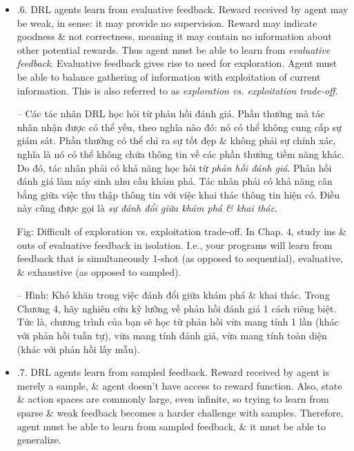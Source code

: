 \documentclass{article}
\begin{document}
\begin{itemize}
\begin{itemize}
\begin{itemize}
            {\bf Difficulty of temporal credit assignment problem.} In Chap. 3, study ins \& outs of sequential feedback in isolation. I.e., your programs learn from simultaneously sequential, supervised (as opposed to evaluative), \& exhaustive (as opposed to sampled) feedback.

            -- {\bf Khó khăn của bài toán gán tín chỉ tạm thời.} Trong Chương 3, hãy nghiên cứu chi tiết \& chi tiết về phản hồi tuần tự 1 cách riêng biệt. Tức là, chương trình của bạn học từ phản hồi tuần tự, có giám sát (khác với phản hồi đánh giá), \& toàn diện (khác với phản hồi lấy mẫu) đồng thời.
            \item {.6. DRL agents learn from evaluative feedback.} Reward received by agent may be weak, in sense: it may provide no supervision. Reward may indicate goodness \& not correctness, meaning it may contain no information about other potential rewards. Thus agent must be able to learn from {\it evaluative feedback}. Evaluative feedback gives rise to need for exploration. Agent must be able to balance gathering of information with exploitation of current information. This is also referred to as {\it exploration vs. exploitation trade-off}.

            -- {\sf Các tác nhân DRL học hỏi từ phản hồi đánh giá.} Phần thưởng mà tác nhân nhận được có thể yếu, theo nghĩa nào đó: nó có thể không cung cấp sự giám sát. Phần thưởng có thể chỉ ra sự tốt đẹp \& không phải sự chính xác, nghĩa là nó có thể không chứa thông tin về các phần thưởng tiềm năng khác. Do đó, tác nhân phải có khả năng học hỏi từ {\it phản hồi đánh giá}. Phản hồi đánh giá làm nảy sinh nhu cầu khám phá. Tác nhân phải có khả năng cân bằng giữa việc thu thập thông tin với việc khai thác thông tin hiện có. Điều này cũng được gọi là {\it sự đánh đổi giữa khám phá \& khai thác}.

            {\sf Fig: Difficult of exploration vs. exploitation trade-off.} In Chap. 4, study ins \& outs of evaluative feedback in isolation. I.e., your programs will learn from feedback that is simultaneously 1-shot (as opposed to sequential), evaluative, \& exhaustive (as opposed to sampled).

            -- {\sf Hình: Khó khăn trong việc đánh đổi giữa khám phá \& khai thác.} Trong Chương 4, hãy nghiên cứu kỹ lưỡng về phản hồi đánh giá 1 cách riêng biệt. Tức là, chương trình của bạn sẽ học từ phản hồi vừa mang tính 1 lần (khác với phản hồi tuần tự), vừa mang tính đánh giá, vừa mang tính toàn diện (khác với phản hồi lấy mẫu).
            \item {.7. DRL agents learn from sampled feedback.} Reward received by agent is merely a sample, \& agent doesn't have access to reward function. Also, state \& action spaces are commonly large, even infinite, so trying to learn from sparse \& weak feedback becomes a harder challenge with samples. Therefore, agent must be able to learn from sampled feedback, \& it must be able to generalize.


\end{itemize}
\end{itemize}
\end{itemize}
\end{document}
